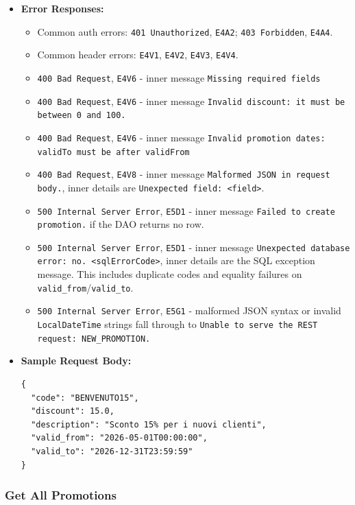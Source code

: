 \begin{itemize}[nosep]
\item \textbf{Error Responses:}

\begin{itemize}[nosep]
\item Common auth errors: \texttt{401 Unauthorized}, \texttt{E4A2}; \texttt{403 Forbidden}, \texttt{E4A4}.
\item Common header errors: \texttt{E4V1}, \texttt{E4V2}, \texttt{E4V3}, \texttt{E4V4}.
\item \texttt{400 Bad Request}, \texttt{E4V6} - inner message \texttt{Missing required fields}
\item \texttt{400 Bad Request}, \texttt{E4V6} - inner message \texttt{Invalid discount: it must be between 0 and 100.}
\item \texttt{400 Bad Request}, \texttt{E4V6} - inner message \texttt{Invalid promotion dates: validTo must be after validFrom}
\item \texttt{400 Bad Request}, \texttt{E4V8} - inner message \texttt{Malformed JSON in request body.}, inner details are \texttt{Unexpected field: <field>}.
\item \texttt{500 Internal Server Error}, \texttt{E5D1} - inner message \texttt{Failed to create promotion.} if the DAO returns no row.
\item \texttt{500 Internal Server Error}, \texttt{E5D1} - inner message \texttt{Unexpected database error: no. <sqlErrorCode>}, inner details are the SQL exception message. This includes duplicate codes and equality failures on \texttt{valid\_from}/\texttt{valid\_to}.
\item \texttt{500 Internal Server Error}, \texttt{E5G1} - malformed JSON syntax or invalid \texttt{LocalDateTime} strings fall through to \texttt{Unable to serve the REST request: NEW\_PROMOTION.}
\end{itemize}

\item \textbf{Sample Request Body:}

\begin{lstlisting}
{
  "code": "BENVENUTO15",
  "discount": 15.0,
  "description": "Sconto 15% per i nuovi clienti",
  "valid_from": "2026-05-01T00:00:00",
  "valid_to": "2026-12-31T23:59:59"
}
\end{lstlisting}
\end{itemize}

\subsubsection*{Get All Promotions}


